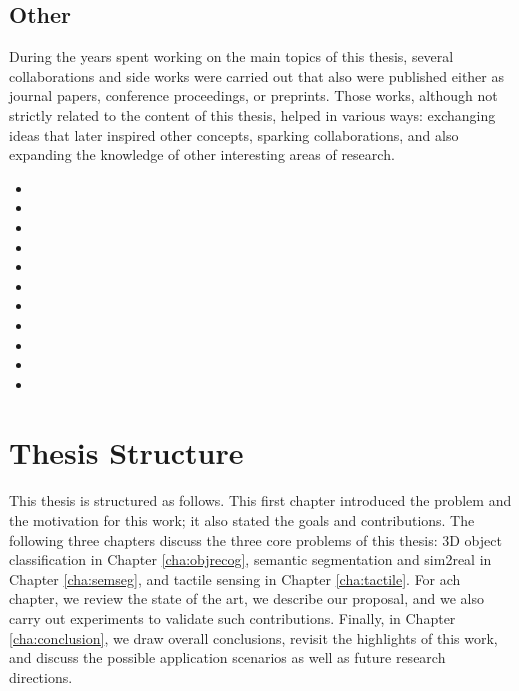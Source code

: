 \subsection{Other}

During the years spent working on the main topics of this thesis, several collaborations and side works were carried out that also were published either as journal papers, conference proceedings, or preprints. Those works, although not strictly related to the content of this thesis, helped in various ways: exchanging ideas that later inspired other concepts, sparking collaborations, and also expanding the knowledge of other interesting areas of research.

\begin{itemize}
  \item {}
  \item {}
  \item {}
  \item {}
  \item {}
  \item {}
  \item {}
  \item {}
  \item {}
  \item {}
  \item {}
\end{itemize}

\section{Thesis Structure}
\label{cha:introduction:sec:structure}

This thesis is structured as follows. This first chapter introduced the problem and the motivation for this work; it also stated the goals and contributions. The following three chapters discuss the three core problems of this thesis: 3D object classification in Chapter \ref{cha:objrecog}, semantic segmentation and sim2real in Chapter \ref{cha:semseg}, and tactile sensing in Chapter \ref{cha:tactile}. For ach chapter, we review the state of the art, we describe our proposal, and we also carry out experiments to validate such contributions. Finally, in Chapter \ref{cha:conclusion}, we draw overall conclusions, revisit the highlights of this work, and discuss the possible application scenarios as well as future research directions.